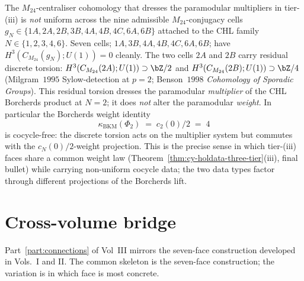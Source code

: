 \begin{remark}
\label{rem:cy-holdata-H3-nonuniform}
The $M_{24}$-centraliser cohomology that dresses the paramodular
multipliers in tier-(iii) is \emph{not} uniform across the nine
admissible $M_{24}$-conjugacy cells $g_N \in \{1A, 2A, 2B, 3B, 4A,
4B, 4C, 6A, 6B\}$ attached to the CHL family $N \in \{1, 2, 3, 4,
6\}$. Seven cells; $1A, 3B, 4A, 4B, 4C, 6A, 6B$; have
$H^3(C_{M_{24}}(g_N); U(1)) = 0$ cleanly. The two cells $2A$ and
$2B$ carry residual discrete torsion:
$H^3(C_{M_{24}}(2A); U(1)) \supset \bZ/2$ and
$H^3(C_{M_{24}}(2B); U(1)) \supset \bZ/4$
(Milgram~$1995$ Sylow-detection at $p = 2$; Benson~$1998$
\emph{Cohomology of Sporadic Groups}). This residual torsion dresses
the paramodular \emph{multiplier} of the CHL Borcherds product at
$N = 2$; it does \emph{not} alter the paramodular \emph{weight}.
In particular the Borcherds weight identity
\[
 \kappa_{\mathrm{BKM}}(\Phi_2) \;=\; c_2(0)/2 \;=\; 4
\]
is cocycle-free: the discrete torsion acts on the multiplier system
but commutes with the $c_N(0)/2$-weight projection. This is the precise
sense in which tier-(iii) faces share a common weight law
(Theorem~\ref{thm:cy-holdata-three-tier}(iii), final bullet) while
carrying non-uniform cocycle data; the two data types factor through
different projections of the Borcherds lift.
\end{remark}


\section{Cross-volume bridge}
\label{sec:cy-cross-volume-bridge}

Part~\ref{part:connections} of Vol~III mirrors the seven-face construction
developed in Vols.~I and II. The common skeleton is the seven-face
construction; the variation is in which face is most concrete.

